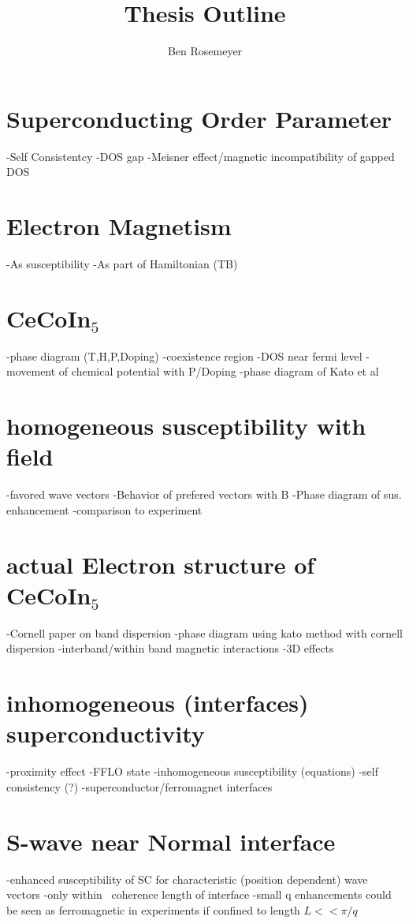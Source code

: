 \documentclass[a4paper,11pt]{article}
\title{Thesis Outline}
\author{Ben Rosemeyer}
\begin{document}
\maketitle
\tableofcontents


\section{Superconducting Order Parameter}
-Self Consistentcy
-DOS gap
-Meisner effect/magnetic incompatibility of gapped DOS
\section{Electron Magnetism}
-As susceptibility
-As part of Hamiltonian (TB)
\section{CeCoIn$_5$}
-phase diagram (T,H,P,Doping)
-coexistence region
-DOS near fermi level
-movement of chemical potential with P/Doping
-phase diagram of Kato et al
\section{homogeneous susceptibility with field}
-favored wave vectors
-Behavior of prefered vectors with B
-Phase diagram of sus. enhancement
-comparison to experiment
\section{actual Electron structure of CeCoIn$_5$}
-Cornell paper on band dispersion
-phase diagram using kato method with cornell dispersion
-interband/within band magnetic interactions
-3D effects
\section{inhomogeneous (interfaces) superconductivity}
-proximity effect
-FFLO state
-inhomogeneous susceptibility (equations)
-self consistency (?)
-superconductor/ferromagnet interfaces
\section{S-wave near Normal interface}
-enhanced susceptibility of SC for characteristic (position dependent) wave vectors
-only within ~coherence length of interface
-small q enhancements could be seen as ferromagnetic in experiments if confined to length $L<<\pi/q$
\end{document}
